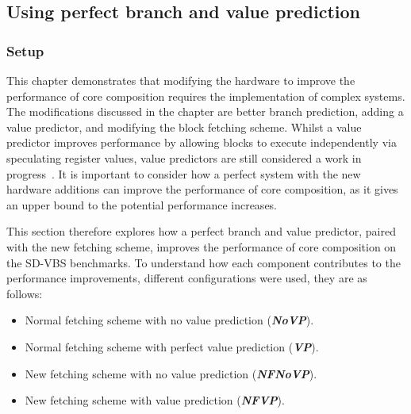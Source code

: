 \newcommand{\novp}{\textit{\textbf{NoVP}}}
\newcommand{\vp}{\textit{\textbf{VP}}}
\newcommand{\nfnovp}{\textit{\textbf{NFNoVP}}}
\newcommand{\nfvp}{\textit{\textbf{NFVP}}}

\newcommand{\vt}{\textit{\textbf{VT}}}
\newcommand{\nfvt}{\textit{\textbf{NFVT}}}

\subsection{Using perfect branch and value prediction}
\subsubsection{Setup}
This chapter demonstrates that modifying the hardware to improve the performance of core composition requires the implementation of complex systems.
The modifications discussed in the chapter are better branch prediction, adding a value predictor, and modifying the block fetching scheme.
Whilst a value predictor improves performance by allowing blocks to execute independently via speculating register values, value predictors are still considered a work in progress~\cite{peraisBeBop2015}.
It is important to consider how a perfect system with the new hardware additions can improve the performance of core composition, as it gives an upper bound to the potential performance increases.

This section therefore explores how a perfect branch and value predictor, paired with the new fetching scheme, improves the performance of core composition on the SD-VBS benchmarks.
To understand how each component contributes to the performance improvements, different configurations were used, they are as follows:
\begin{itemize}
\item Normal fetching scheme with no value prediction (\novp).
\vspace{-1em}
\item Normal fetching scheme with perfect value prediction (\vp).
\vspace{-1em}
\item New fetching scheme with no value prediction (\nfnovp).
\vspace{-1em}
\item New fetching scheme with value prediction (\nfvp).
\end{itemize}

